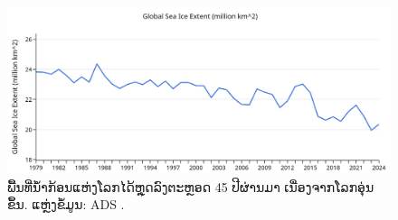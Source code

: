\documentclass[10pt,twocolumn,letterpaper]{article}
\begin{document}
\begin{figure}[t]
\begin{center}
\includegraphics[width=1\textwidth]{ice.jpg}
\end{center}
   \caption{ພື້ນທີ່ນໍ້າກ້ອນແຫ່ງໂລກໄດ້ຫຼຸດລົງຕະຫຼອດ 45 ປີຜ່ານມາ ເນື່ອງຈາກໂລກອຸ່ນຂຶ້ນ. ແຫຼ່ງຂໍ້ມູນ: ADS \cite{149}.}
\label{fig:24}
\end{figure}

\clearpage
\twocolumn

{\small
\renewcommand{\refname}{ບັນຊີອ້າງອິງ}


}
\end{document}

